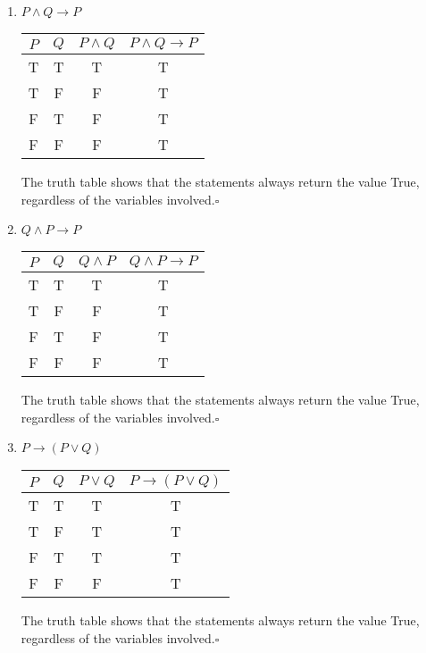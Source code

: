 \documentclass[11pt]{article}
\begin{document}
\begin{enumerate}
	\item $P \wedge Q \rightarrow P$
	      \begin{center}
		      \begin{tabular}{|c|c|c|c|}
			      \hline
			      $P$ & $Q$ & $P \wedge Q$ & $P \wedge Q \rightarrow P$ \\
			      \hline
			      T   & T   & T            & T                          \\
			      T   & F   & F            & T                          \\
			      F   & T   & F            & T                          \\
			      F   & F   & F            & T                          \\
			      \hline
		      \end{tabular}
	      \end{center}
	      The truth table shows that the statements always return the value True, regardless of the variables involved.\qquad $\square$

	\item $Q \wedge P \rightarrow P$
	      \begin{center}
		      \begin{tabular}{|c|c|c|c|}
			      \hline
			      $P$ & $Q$ & $Q \wedge P$ & $Q \wedge P \rightarrow P$ \\
			      \hline
			      T   & T   & T            & T                          \\
			      T   & F   & F            & T                          \\
			      F   & T   & F            & T                          \\
			      F   & F   & F            & T                          \\
			      \hline
		      \end{tabular}
	      \end{center}
	      The truth table shows that the statements always return the value True, regardless of the variables involved.\qquad $\square$

	\item $P \rightarrow(P \vee Q)$
	      \begin{center}
		      \begin{tabular}{|c|c|c|c|}
			      \hline
			      $P$ & $Q$ & $P \vee Q$ & $P \rightarrow(P \vee Q)$ \\
			      \hline
			      T   & T   & T          & T                         \\
			      T   & F   & T          & T                         \\
			      F   & T   & T          & T                         \\
			      F   & F   & F          & T                         \\
			      \hline
		      \end{tabular}
	      \end{center}
	      The truth table shows that the statements always return the value True, regardless of the variables involved.\qquad $\square$


\end{enumerate}
\end{document}
